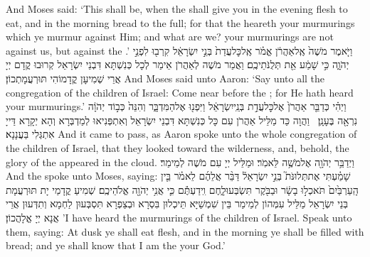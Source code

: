 {And Moses said: ‘This shall be, when the \lord\space shall give you in the evening flesh to eat, and in the morning bread to the full; for that the \lord\space heareth your murmurings which ye murmur against Him; and what are we? your murmurings are not against us, but against the \lord.’}{}
{וַיֹּ֤אמֶר מֹשֶׁה֙ אֶֽל\maqqaf אַהֲרֹ֔ן אֱמֹ֗ר אֶֽל\maqqaf כׇּל\maqqaf עֲדַת֙ בְּנֵ֣י יִשְׂרָאֵ֔ל קִרְב֖וּ לִפְנֵ֣י יְהֹוָ֑ה כִּ֣י שָׁמַ֔ע אֵ֖ת תְּלֻנֹּתֵיכֶֽם׃}
{וַאֲמַר מֹשֶׁה לְאַהֲרֹן אֵימַר לְכָל כְּנִשְׁתָּא דִּבְנֵי יִשְׂרָאֵל קְרוּבוּ קֳדָם יְיָ אֲרֵי שְׁמִיעָן קֳדָמוֹהִי תּוּרְעֲמָתְכוֹן׃}
{And Moses said unto Aaron: ‘Say unto all the congregation of the children of Israel: Come near before the \lord; for He hath heard your murmurings.’}{}
{וַיְהִ֗י כְּדַבֵּ֤ר אַהֲרֹן֙ אֶל\maqqaf כׇּל\maqqaf עֲדַ֣ת בְּנֵֽי\maqqaf יִשְׂרָאֵ֔ל וַיִּפְנ֖וּ אֶל\maqqaf הַמִּדְבָּ֑ר וְהִנֵּה֙ כְּב֣וֹד יְהֹוָ֔ה נִרְאָ֖ה בֶּעָנָֽן׃ \petucha }
{וַהֲוָה כַּד מַלֵּיל אַהֲרֹן עִם כָּל כְּנִשְׁתָּא דִּבְנֵי יִשְׂרָאֵל וְאִתְפְּנִיאוּ לְמַדְבְּרָא וְהָא יְקָרָא דַּייָ אִתְגְּלִי בַּעֲנָנָא׃}
{And it came to pass, as Aaron spoke unto the whole congregation of the children of Israel, that they looked toward the wilderness, and, behold, the glory of the \lord\space appeared in the cloud.}{}
{וַיְדַבֵּ֥ר יְהֹוָ֖ה אֶל\maqqaf מֹשֶׁ֥ה לֵּאמֹֽר׃}
{וּמַלֵּיל יְיָ עִם מֹשֶׁה לְמֵימַר׃}
{And the \lord\space spoke unto Moses, saying:}{}
{שָׁמַ֗עְתִּי אֶת\maqqaf תְּלוּנֹּת֮ בְּנֵ֣י יִשְׂרָאֵל֒ דַּבֵּ֨ר אֲלֵהֶ֜ם לֵאמֹ֗ר בֵּ֤ין הָֽעַרְבַּ֙יִם֙ תֹּאכְל֣וּ בָשָׂ֔ר וּבַבֹּ֖קֶר תִּשְׂבְּעוּ\maqqaf לָ֑חֶם וִֽידַעְתֶּ֕ם כִּ֛י אֲנִ֥י יְהֹוָ֖ה אֱלֹהֵיכֶֽם׃}
{שְׁמִיעַ קֳדָמַי יָת תּוּרְעֲמָת בְּנֵי יִשְׂרָאֵל מַלֵּיל עִמְּהוֹן לְמֵימַר בֵּין שִׁמְשַׁיָּא תֵּיכְלוּן בִּסְרָא וּבְצַפְרָא תִּסְבְּעוּן לַחְמָא וְתִדְּעוּן אֲרֵי אֲנָא יְיָ אֱלָהֲכוֹן׃}
{’I have heard the murmurings of the children of Israel. Speak unto them, saying: At dusk ye shall eat flesh, and in the morning ye shall be filled with bread; and ye shall know that I am the \lord\space your God.’}{}
